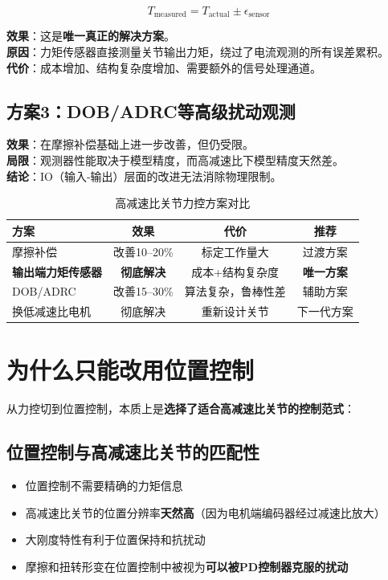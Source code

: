 \begin{equation}
T_{\text{measured}} = T_{\text{actual}} \pm \epsilon_{\text{sensor}}
\end{equation}

\textbf{效果}：这是\textbf{唯一真正的解决方案}。\\
\textbf{原因}：力矩传感器直接测量关节输出力矩，绕过了电流观测的所有误差累积。\\
\textbf{代价}：成本增加、结构复杂度增加、需要额外的信号处理通道。

\subsection{方案3：DOB/ADRC等高级扰动观测}

\textbf{效果}：在摩擦补偿基础上进一步改善，但仍受限。\\
\textbf{局限}：观测器性能取决于模型精度，而高减速比下模型精度天然差。\\
\textbf{结论}：IO（输入-输出）层面的改进无法消除物理限制。

\begin{table}[H]
\centering
\begin{tabular}{lccc}
\toprule
\textbf{方案} & \textbf{效果} & \textbf{代价} & \textbf{推荐} \\
\midrule
摩擦补偿 & 改善10--20\% & 标定工作量大 & 过渡方案 \\
\textbf{输出端力矩传感器} & \textbf{彻底解决} & 成本+结构复杂度 & \textbf{唯一方案} \\
DOB/ADRC & 改善15--30\% & 算法复杂，鲁棒性差 & 辅助方案 \\
换低减速比电机 & 彻底解决 & 重新设计关节 & 下一代方案 \\
\bottomrule
\end{tabular}
\caption{高减速比关节力控方案对比}
\label{tab:fix_solutions}
\end{table}

\section{为什么只能改用位置控制}

从力控切到位置控制，本质上是\textbf{选择了适合高减速比关节的控制范式}：

\subsection{位置控制与高减速比关节的匹配性}

\begin{itemize}
  \item 位置控制不需要精确的力矩信息
  \item 高减速比关节的位置分辨率\textbf{天然高}（因为电机端编码器经过减速比放大）
  \item 大刚度特性有利于位置保持和抗扰动
  \item 摩擦和扭转形变在位置控制中被视为\textbf{可以被PD控制器克服的扰动}
\end{itemize}

